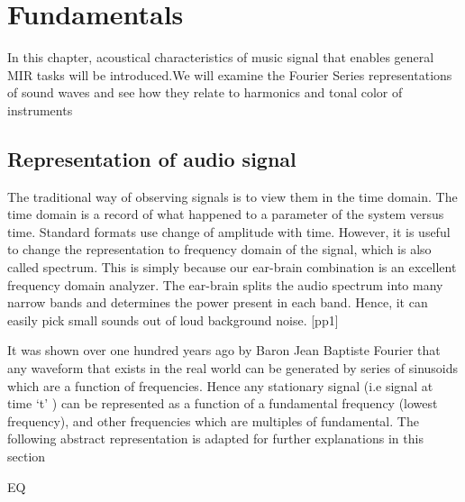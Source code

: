 
\chapter{Fundamentals} %

\label{Chapter2} %



In this chapter, acoustical characteristics of music signal that enables general MIR tasks will be introduced.We will examine the Fourier Series representations of sound waves and see how they relate to harmonics and tonal color of instruments  




\section{Representation of audio signal}
The traditional way of observing signals is to view them in the time domain. The time domain is a record of what happened to a parameter of the system versus time. Standard formats use change of amplitude with time. However, it is useful to change the representation to frequency domain of the signal, which is also called spectrum. This is simply because our ear-brain combination is an excellent frequency domain analyzer. The ear-brain splits the audio spectrum into many narrow bands and determines the power present in each band. Hence, it can easily pick small sounds out of loud background noise. [pp1]
 
It was shown over one hundred years ago by Baron Jean Baptiste Fourier that any waveform that exists in the real world can be generated by series of sinusoids which are a function of frequencies. Hence any stationary signal  (i.e signal at time ‘t’ ) can be represented as a function of a fundamental frequency (lowest frequency), and other frequencies which are multiples of fundamental. The following abstract representation is adapted for further explanations in this section

EQ


